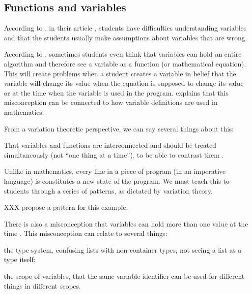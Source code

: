 \subsection{Functions and variables}

According to \textcite{MisconceptionsSurvey2017}, in their article 
, students have difficulties understanding 
variables and that the students usually make assumptions about variables that 
are wrong.

According to \textcite{Kohn2017VariableEvaluation,Plass2015Variables,Doukakis2007}, 
sometimes students even think that variables can hold an entire algorithm and 
therefore see a variable as a function (or mathematical equation). This will 
create problems when a student creates a variable in belief that the variable 
will change its value when the equation is supposed to change its value or at 
the time when the variable is used in the program.
\Textcite{Kohn2017VariableEvaluation} explains that this misconception can be 
connected to how variable definitions are used in mathematics. 

From a variation theoretic perspective, we can say several things about this:
\begin{enumerate*}
  \item That variables and functions are interconnected and should be treated 
    simultaneously (not \enquote{one thing at a time}), to be able to contrast 
    them \parencite[\cf][Ch~6, pp~167--168]{NCOL}.
  \item Unlike in mathematics, every line in a piece of program (in an 
    imperative language) is constitutes a new state of the program.
    We must teach this to students through a series of patterns, as dictated by 
    variation theory.
\end{enumerate*}

XXX propose a pattern for this example.

There is also a misconception that variables can hold more than one value at 
the time \parencite{Doukakis2007}.
This misconception can relate to several things:
\begin{enumerate*}
  \item the type system, confusing lists with non-container types, not seeing a 
    list as a type itself;
  \item the scope of variables, that the same variable identifier can be used 
    for different things in different scopes.
\end{enumerate*}

